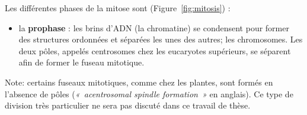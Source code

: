 \documentclass[12pt,a4paper,twoside,openright]{book}
\providecommand{\tightlist}{%
  \setlength{\itemsep}{0pt}\setlength{\parskip}{0pt}}
\begin{document}
Les différentes phases de la mitose sont (Figure~\ref{fig:mitosis}) :

\begin{itemize}
\tightlist
\item
  la \textbf{prophase} : les brins d'ADN (la chromatine) se condensent
  pour former des structures ordonnées et séparées les unes des autres;
  les chromosomes. Les deux pôles, appelés centrosomes chez les
  eucaryotes supérieurs, se séparent afin de former le fuseau mitotique.
\end{itemize}

Note: certains fuseaux mitotiques, comme chez les plantes, sont formés
en l'absence de pôles (\emph{«~acentrosomal spindle formation~»} en
anglais). Ce type de division très particulier ne sera pas discuté dans
ce travail de thèse.
\end{document}
